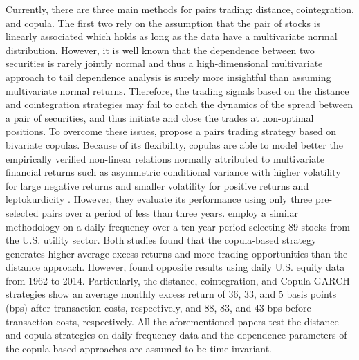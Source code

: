 \documentclass[a4paper,12pt]{report}
\begin{document}
Currently, there are three main methods for pairs trading: distance, cointegration, and copula. The first two rely on the assumption that the pair of stocks is linearly associated which holds as long as the data have a multivariate normal distribution. However, it is well known that the dependence between two securities is rarely jointly normal \citep{campbell97,cont01,ane03,mcneil15} and thus a high-dimensional multivariate approach to tail dependence analysis is surely more insightful than assuming multivariate normal returns. Therefore, the trading signals based on the distance and cointegration strategies may fail to catch the dynamics of the spread between a pair of securities, and thus initiate and close the trades at non-optimal positions. To overcome these issues, \citet*{lw2013} propose a pairs trading strategy based on bivariate copulas. Because of its flexibility, copulas are able to model better the empirically verified non-linear relations normally attributed to multivariate financial returns such as asymmetric conditional variance with higher volatility for large negative returns and smaller volatility for positive returns \citep{h98} and leptokurdicity \citep{t01,andreou01}. However, they evaluate its performance using only three pre-selected pairs over a period of less than three years. \citet*{xie14} employ a similar methodology on a daily frequency over a ten-year period selecting 89 stocks from the U.S. utility sector. Both studies found that the copula-based strategy generates higher average excess returns and more trading opportunities than the distance approach. However, \citet*{rf15} found opposite results using daily U.S. equity data from 1962 to 2014. Particularly, the distance, cointegration, and Copula-GARCH strategies show an average monthly excess return of 36, 33, and 5 basis points (bps) after transaction costs, respectively, and 88, 83, and 43 bps before transaction costs, respectively.  All the aforementioned papers test the distance and copula strategies on daily frequency data and the dependence parameters of the copula-based approaches are assumed to be time-invariant.
\end{document}
